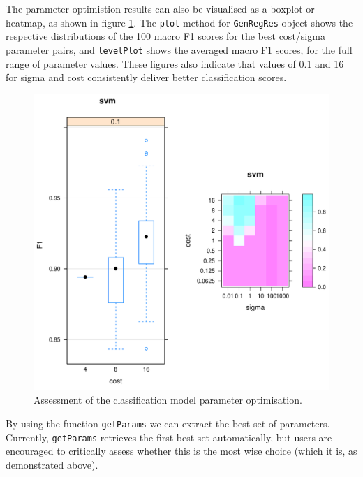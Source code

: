 The parameter optimistion results can also be visualised as a boxplot
or heatmap, as shown in figure \ref{fig:visualisOptHide}.  The
\texttt{plot} method for \texttt{GenRegRes} object shows the
respective distributions of the 100 macro F1 scores for the best
cost/sigma parameter pairs, and \texttt{levelPlot} shows the averaged
macro F1 scores, for the full range of parameter values. These figures
also indicate that values of 0.1 and 16 for sigma and cost
consistently deliver better classification scores.

\begin{knitrout}
\color{fgcolor}\begin{kframe}
\begin{alltt}
\end{alltt}
\end{kframe}
\end{knitrout}

\begin{figure}[!ht]
  \centering
\begin{knitrout}
\color{fgcolor}
\includegraphics[width=.65\textwidth]{figure/visualiseOptHide-1} 

\end{knitrout}
  \caption{Assessment of the classification model parameter optimisation.}
  \label{fig:visualisOptHide}
\end{figure}

\pagebreak

By using the function \texttt{getParams} we can extract the best set
of parameters. Currently, \texttt{getParams} retrieves the first best
set automatically, but users are encouraged to critically assess
whether this is the most wise choice (which it is, as demonstrated
above).

